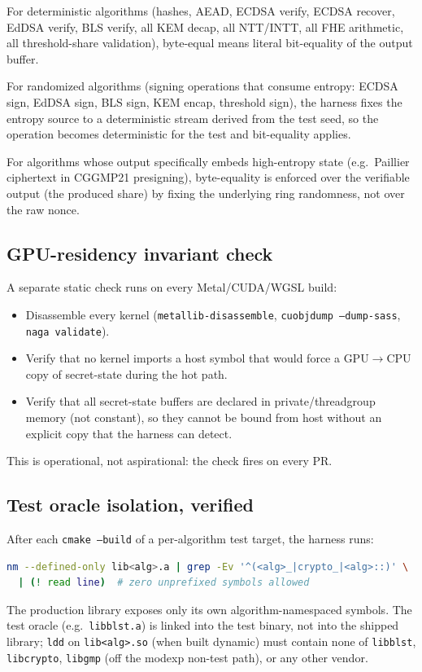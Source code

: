 For deterministic algorithms (hashes, AEAD, ECDSA verify, ECDSA recover, EdDSA verify, BLS verify, all KEM decap, all NTT/INTT, all FHE arithmetic, all threshold-share validation), byte-equal means literal bit-equality of the output buffer.

For randomized algorithms (signing operations that consume entropy: ECDSA sign, EdDSA sign, BLS sign, KEM encap, threshold sign), the harness fixes the entropy source to a deterministic stream derived from the test seed, so the operation becomes deterministic for the test and bit-equality applies.

For algorithms whose output specifically embeds high-entropy state (e.g.\ Paillier ciphertext in CGGMP21 presigning), byte-equality is enforced over the verifiable output (the produced share) by fixing the underlying ring randomness, not over the raw nonce.

\subsection{GPU-residency invariant check}

A separate static check runs on every Metal/CUDA/WGSL build:

\begin{itemize}
\item Disassemble every kernel (\texttt{metallib-disassemble}, \texttt{cuobjdump --dump-sass}, \texttt{naga validate}).
\item Verify that no kernel imports a host symbol that would force a GPU$\rightarrow$CPU copy of secret-state during the hot path.
\item Verify that all secret-state buffers are declared in private/threadgroup memory (not constant), so they cannot be bound from host without an explicit copy that the harness can detect.
\end{itemize}

This is operational, not aspirational: the check fires on every PR.

\subsection{Test oracle isolation, verified}

After each \texttt{cmake --build} of a per-algorithm test target, the harness runs:

\begin{lstlisting}[language=bash]
nm --defined-only lib<alg>.a | grep -Ev '^(<alg>_|crypto_|<alg>::)' \
  | (! read line)  # zero unprefixed symbols allowed
\end{lstlisting}

The production library exposes only its own algorithm-namespaced symbols. The test oracle (e.g.\ \texttt{libblst.a}) is linked into the test binary, not into the shipped library; \texttt{ldd} on \texttt{lib<alg>.so} (when built dynamic) must contain none of \texttt{libblst}, \texttt{libcrypto}, \texttt{libgmp} (off the modexp non-test path), or any other vendor.
